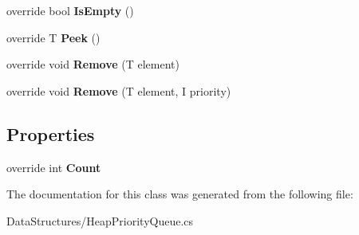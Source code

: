 \begin{DoxyCompactItemize}
\item 
\mbox{\label{class_data_structures_1_1_heap_priority_queue_ab867fe3b8dbbe4635445e0e2209cab57}} 
override bool {\bfseries Is\+Empty} ()
\item 
\mbox{\label{class_data_structures_1_1_heap_priority_queue_a2ba85a275a772c791c3a3e794a67429c}} 
override T {\bfseries Peek} ()
\item 
\mbox{\label{class_data_structures_1_1_heap_priority_queue_ae082d3747d6a2421a34abea334fbb560}} 
override void {\bfseries Remove} (T element)
\item 
\mbox{\label{class_data_structures_1_1_heap_priority_queue_a8caf23c97ecbbb8ed80c81fa5031fbad}} 
override void {\bfseries Remove} (T element, I priority)
\end{DoxyCompactItemize}
\subsection*{Properties}
\begin{DoxyCompactItemize}
\item 
\mbox{\label{class_data_structures_1_1_heap_priority_queue_a39882f58019d6f6c16702ef5dd16b174}} 
override int {\bfseries Count}
\end{DoxyCompactItemize}


The documentation for this class was generated from the following file\+:\begin{DoxyCompactItemize}
\item 
Data\+Structures/Heap\+Priority\+Queue.\+cs\end{DoxyCompactItemize}
